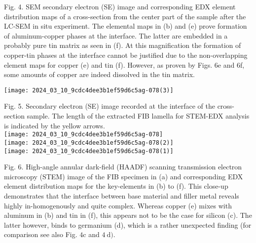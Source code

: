 \documentclass[10pt]{article}
\begin{document}
Fig. 4. SEM secondary electron (SE) image and corresponding EDX element distribution maps of a cross-section from the center part of the sample after the LC-SEM in situ experiment. The elemental maps in (b) and (e) prove formation of aluminum-copper phases at the interface. The latter are embedded in a probably pure tin matrix as seen in (f). At this magnification the formation of copper-tin phases at the interface cannot be justified due to the non-overlapping element maps for copper (e) and tin (f). However, as proven by Figs. 6e and 6f, some amounts of copper are indeed dissolved in the tin matrix.

\begin{center}
\texttt{[image: 2024\_03\_10\_9cdc4dee3b1ef59d6c5ag-078(3)]}
\end{center}

Fig. 5. Secondary electron (SE) image recorded at the interface of the cross-section sample. The length of the extracted FIB lamella for STEM-EDX analysis is indicated by the yellow arrows.\\
\texttt{[image: 2024\_03\_10\_9cdc4dee3b1ef59d6c5ag-078]}\\
\texttt{[image: 2024\_03\_10\_9cdc4dee3b1ef59d6c5ag-078(2)]}\\
\texttt{[image: 2024\_03\_10\_9cdc4dee3b1ef59d6c5ag-078(1)]}

Fig. 6. High-angle annular dark-field (HAADF) scanning transmission electron microscopy (STEM) image of the FIB specimen in (a) and corresponding EDX element distribution maps for the key-elements in (b) to (f). This close-up demonstrates that the interface between base material and filler metal reveals highly in-homogenously and quite complex. Whereas copper (e) mixes with aluminum in (b) and tin in (f), this appears not to be the case for silicon (c). The latter however, binds to germanium (d), which is a rather unexpected finding (for comparison see also Fig. $4 \mathrm{c}$ and $4 \mathrm{~d})$.
\end{document}
